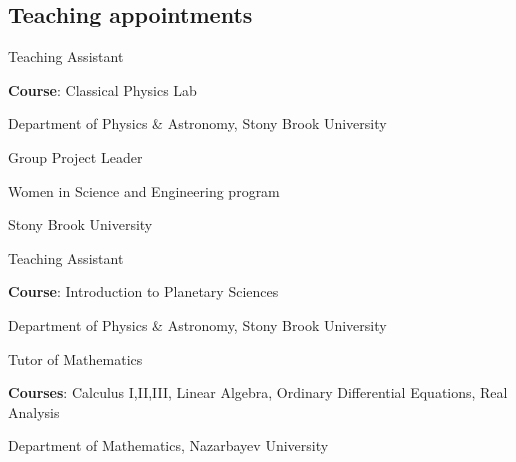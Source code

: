 \documentclass[10pt]{article} %
\begin{document}
\begin{paracol}{1}

	


\section{Teaching appointments} 
	{Teaching Assistant}
	{\textbf{Course}: Classical Physics Lab
	
	Department of Physics \& Astronomy, Stony Brook University}

	{Group Project Leader}
	{ Women in Science and Engineering program
	
	Stony Brook University}
	
	{Teaching Assistant}
	{\textbf{Course}: Introduction to Planetary Sciences
	
	Department of Physics \& Astronomy, Stony Brook University}
	
	
	{Tutor of Mathematics}
	{\textbf{Courses}: Calculus I,II,III, Linear Algebra, Ordinary Differential Equations, Real Analysis
	
	Department of Mathematics, Nazarbayev University}

	



\end{paracol}
\end{document}
